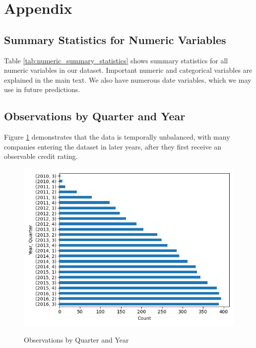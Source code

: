 \documentclass{article}[11pt]
\begin{document}
    \clearpage
    \newpage

    
    

    \clearpage
    \newpage

    \appendix


    \section{Appendix}

    \subsection{Summary Statistics for Numeric Variables}

    Table \ref{tab:numeric_summary_statistics} shows summary statistics for all numeric variables in our dataset. Important numeric and categorical variables are explained in the main text. We also have numerous date variables, which we may use in future predictions.

    

    \clearpage
    \newpage

    \subsection{Observations by Quarter and Year}

    Figure \ref{fig:obs-by-quarter-year} demonstrates that the data is temporally unbalanced, with many companies entering the dataset in later years, after they first receive an observable credit rating.

    \begin{figure}[h!]
		\centering
        \caption{Observations by Quarter and Year}
        \includegraphics[width=0.6\linewidth,keepaspectratio=true]{../Output/All Data EDA/Tabular EDA/all_data_fixed_quarter_dates_obs_by_year_quarter_no_title.png}
        \label{fig:obs-by-quarter-year}
	\end{figure}
\end{document}
